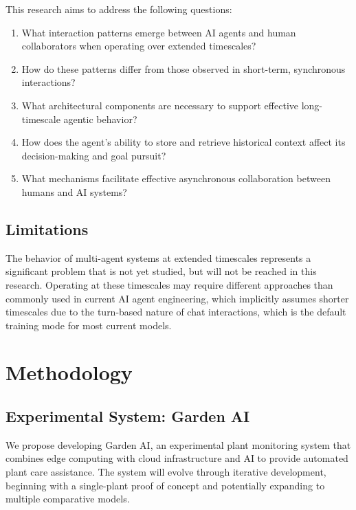 \documentclass[12pt,letterpaper]{article}
\begin{document}
This research aims to address the following questions:

\begin{enumerate}
    \item What interaction patterns emerge between AI agents and human collaborators when operating over extended timescales?
    \item How do these patterns differ from those observed in short-term, synchronous interactions?
    \item What architectural components are necessary to support effective long-timescale agentic behavior?
    \item How does the agent's ability to store and retrieve historical context affect its decision-making and goal pursuit?
    \item What mechanisms facilitate effective asynchronous collaboration between humans and AI systems?
\end{enumerate}

\subsection{Limitations}

The behavior of multi-agent systems at extended timescales represents a significant problem that is not yet studied, but will not be reached in this research. Operating at these timescales may require different approaches than commonly used in current AI agent engineering, which implicitly assumes shorter timescales due to the turn-based nature of chat interactions, which is the default training mode for most current models.

\section{Methodology}

\subsection{Experimental System: Garden AI}

We propose developing Garden AI, an experimental plant monitoring system that combines edge computing with cloud infrastructure and AI to provide automated plant care assistance. The system will evolve through iterative development, beginning with a single-plant proof of concept and potentially expanding to multiple comparative models.
\end{document}
